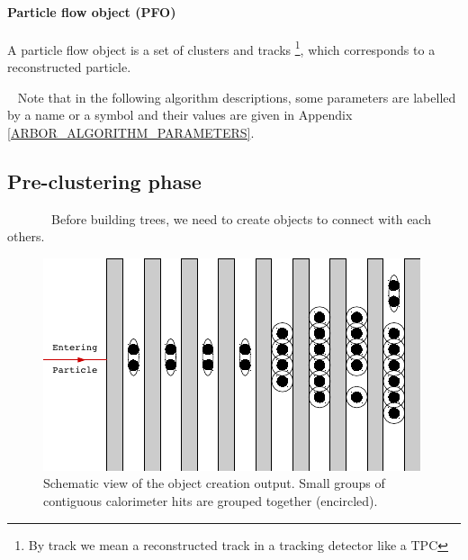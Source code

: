 \documentclass[cits]{JINST}
\begin{document}
\paragraph*{Particle flow object (PFO)} A particle flow object is a set of clusters and tracks \footnote{By track we mean a reconstructed track in a tracking detector like a TPC}, which corresponds to a reconstructed particle.

~\newline 
Note that in the following algorithm descriptions, some parameters are labelled by a name or a symbol and their values are given in Appendix \ref{ARBOR_ALGORITHM_PARAMETERS}.

\subsection{Pre-clustering phase} 

~~~~~~~Before building trees, we need to create objects to connect with each others.

\begin{figure}
  \vspace{-20pt}
  \begin{center}
    \includegraphics[width=\linewidth]{ObjectCreationAfter.pdf}
  \end{center}
  \vspace{-10pt}
  \caption{\label{ARBOR_OBJECT_CREATION} Schematic view of the object creation output. Small groups of contiguous calorimeter hits are grouped together (encircled).}
  \vspace{-20pt}
\end{figure}
\end{document}
